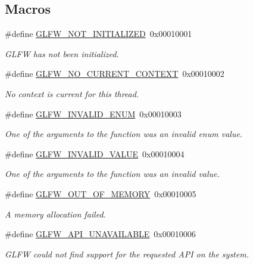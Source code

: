 \subsection*{Macros}
\begin{DoxyCompactItemize}
\item 
\#define \hyperlink{group__errors_ga2374ee02c177f12e1fa76ff3ed15e14a}{G\+L\+F\+W\+\_\+\+N\+O\+T\+\_\+\+I\+N\+I\+T\+I\+A\+L\+I\+Z\+ED}~0x00010001
\begin{DoxyCompactList}\small\item\em G\+L\+FW has not been initialized. \end{DoxyCompactList}\item 
\#define \hyperlink{group__errors_gaa8290386e9528ccb9e42a3a4e16fc0d0}{G\+L\+F\+W\+\_\+\+N\+O\+\_\+\+C\+U\+R\+R\+E\+N\+T\+\_\+\+C\+O\+N\+T\+E\+XT}~0x00010002
\begin{DoxyCompactList}\small\item\em No context is current for this thread. \end{DoxyCompactList}\item 
\#define \hyperlink{group__errors_ga76f6bb9c4eea73db675f096b404593ce}{G\+L\+F\+W\+\_\+\+I\+N\+V\+A\+L\+I\+D\+\_\+\+E\+N\+UM}~0x00010003
\begin{DoxyCompactList}\small\item\em One of the arguments to the function was an invalid enum value. \end{DoxyCompactList}\item 
\#define \hyperlink{group__errors_gaaf2ef9aa8202c2b82ac2d921e554c687}{G\+L\+F\+W\+\_\+\+I\+N\+V\+A\+L\+I\+D\+\_\+\+V\+A\+L\+UE}~0x00010004
\begin{DoxyCompactList}\small\item\em One of the arguments to the function was an invalid value. \end{DoxyCompactList}\item 
\#define \hyperlink{group__errors_ga9023953a2bcb98c2906afd071d21ee7f}{G\+L\+F\+W\+\_\+\+O\+U\+T\+\_\+\+O\+F\+\_\+\+M\+E\+M\+O\+RY}~0x00010005
\begin{DoxyCompactList}\small\item\em A memory allocation failed. \end{DoxyCompactList}\item 
\#define \hyperlink{group__errors_ga56882b290db23261cc6c053c40c2d08e}{G\+L\+F\+W\+\_\+\+A\+P\+I\+\_\+\+U\+N\+A\+V\+A\+I\+L\+A\+B\+LE}~0x00010006
\begin{DoxyCompactList}\small\item\em G\+L\+FW could not find support for the requested A\+PI on the system. \end{DoxyCompactList}\item 

\end{DoxyCompactItemize}
